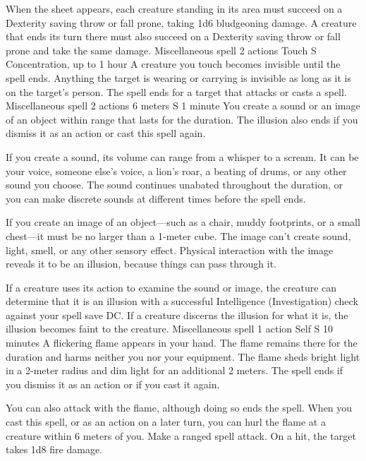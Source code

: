     When the sheet appears, each creature standing in its area must succeed on a Dexterity saving throw or fall prone, taking 1d6 bludgeoning damage.
    A creature that ends its turn there must also succeed on a Dexterity saving throw or fall prone and take the same damage.
    {Miscellaneous spell}
    {2 actions}
    {Touch}
    {S}
    {Concentration, up to 1 hour}
    A creature you touch becomes invisible until the spell ends.
    Anything the target is wearing or carrying is invisible as long as it is on the target's person.
    The spell ends for a target that attacks or casts a spell.
    {Miscellaneous spell}
    {2 actions}
    {6 meters}
    {S}
    {1 minute}
    You create a sound or an image of an object within range that lasts for the duration.
    The illusion also ends if you dismiss it as an action or cast this spell again.

    If you create a sound, its volume can range from a whisper to a scream.
    It can be your voice, someone else's voice, a lion's roar, a beating of drums, or any other sound you choose.
    The sound continues unabated throughout the duration, or you can make discrete sounds at different times before the spell ends.

    If you create an image of an object---such as a chair, muddy footprints, or a small chest---it must be no larger than a 1-meter cube.
    The image can't create sound, light, smell, or any other sensory effect.
    Physical interaction with the image reveals it to be an illusion, because things can pass through it.

    If a creature uses its action to examine the sound or image, the creature can determine that it is an illusion with a successful Intelligence (Investigation) check against your spell save DC.
    If a creature discerns the illusion for what it is, the illusion becomes faint to the creature.
    {Miscellaneous spell}
    {1 action}
    {Self}
    {S}
    {10 minutes}
    A flickering flame appears in your hand.
    The flame remains there for the duration and harms neither you nor your equipment.
    The flame sheds bright light in a 2-meter radius and dim light for an additional 2 meters.
    The spell ends if you dismiss it as an action or if you cast it again.

    You can also attack with the flame, although doing so ends the spell.
    When you cast this spell, or as an action on a later turn, you can hurl the flame at a creature within 6 meters of you.
    Make a ranged spell attack.
    On a hit, the target takes 1d8 fire damage.

